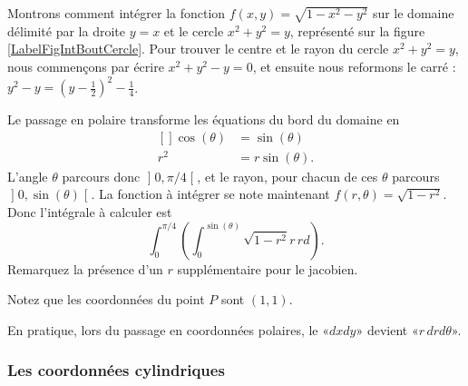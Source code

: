 \begin{example}     \label{ExpmfDtAtV}
    Montrons comment intégrer la fonction $f(x,y)=\sqrt{1-x^2-y^2}$ sur le domaine délimité par la droite $y=x$ et le cercle $x^2+y^2=y$, représenté sur la figure \ref{LabelFigIntBoutCercle}. Pour trouver le centre et le rayon du cercle $x^2+y^2=y$, nous commençons par écrire $x^2+y^2-y=0$, et ensuite nous reformons le carré : $y^2-y=(y-\frac{ 1 }{2})^2-\frac{1}{ 4 }$.
    \newcommand{\CaptionFigIntBoutCercle}{Passage en polaire pour intégrer sur un morceau de cercle.}
    
    Le passage en polaire transforme les équations du bord du domaine en
    \begin{equation}
        \begin{aligned}[]
            \cos(\theta)&=\sin(\theta)\\
            r^2&=r\sin(\theta).
        \end{aligned}
    \end{equation}
    L'angle $\theta$ parcours donc $\mathopen] 0 , \pi/4 \mathclose[$, et le rayon, pour chacun de ces $\theta$ parcours $\mathopen] 0 , \sin(\theta) \mathclose[$. La fonction à intégrer se note maintenant $f(r,\theta)=\sqrt{1-r^2}$. Donc l'intégrale à calculer est
    \begin{equation}		\label{PgRapIntMultFubiniBoutCercle}
        \int_{0}^{\pi/4}\left( \int_0^{\sin(\theta)}\sqrt{1-r^2}r\,rd \right).
    \end{equation}
    Remarquez la présence d'un $r$ supplémentaire pour le jacobien.

    Notez que les coordonnées du point $P$ sont $(1,1)$.
\end{example}


En pratique, lors du passage en coordonnées polaires, le «$dxdy$» devient «$r\,drd\theta$».

\subsubsection{Les coordonnées cylindriques}

